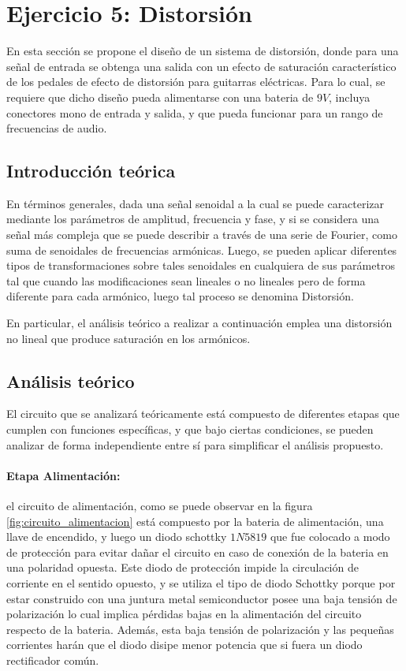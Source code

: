 
\section{Ejercicio 5: Distorsi\'on}
En esta secci\'on se propone el dise\~no de un sistema de distorsi\'on, donde para una se\~nal de entrada se obtenga una salida
con un efecto de saturaci\'on caracter\'istico de los pedales de efecto de distorsi\'on para guitarras el\'ectricas. Para lo cual,
se requiere que dicho dise\~no pueda alimentarse con una bateria de $9V$, incluya conectores mono de entrada y salida, y que pueda funcionar para un rango
de frecuencias de audio.

\subsection{Introducci\'on te\'orica}
En t\'erminos generales, dada una se\~nal senoidal a la cual se puede caracterizar mediante los par\'ametros de amplitud, frecuencia y fase,
y si se considera una se\~nal m\'as compleja que se puede describir a trav\'es de una serie de Fourier, como suma de senoidales de frecuencias arm\'onicas. Luego, 
se pueden aplicar diferentes tipos de transformaciones sobre tales senoidales en cualquiera de sus par\'ametros tal
que cuando las modificaciones sean lineales o no lineales pero de forma diferente para cada arm\'onico, luego tal proceso se denomina Distorsi\'on.

En particular, el an\'alisis te\'orico a realizar a continuaci\'on emplea una distorsi\'on no lineal que produce saturaci\'on en los arm\'onicos.

\subsection{An\'alisis te\'orico}
El circuito que se analizar\'a te\'oricamente est\'a compuesto de diferentes etapas que cumplen con funciones
espec\'ificas, y que bajo ciertas condiciones, se pueden analizar de forma independiente entre s\'i para simplificar el an\'alisis propuesto.

\paragraph*{Etapa Alimentaci\'on:} el circuito de alimentaci\'on, como se puede observar en la figura \ref{fig:circuito_alimentacion}
est\'a compuesto por la bateria de alimentaci\'on, una llave de encendido, y luego un diodo schottky $1N5819$ que fue colocado a modo de protecci\'on
para evitar da\~nar el circuito en caso de conexi\'on de la bateria en una polaridad opuesta. Este diodo de protecci\'on impide la circulaci\'on de corriente
en el sentido opuesto, y se utiliza el tipo de diodo Schottky porque por estar construido con una juntura metal semiconductor posee una baja tensi\'on de polarizaci\'on
lo cual implica p\'erdidas bajas en la alimentaci\'on del circuito respecto de la bateria. Adem\'as, esta baja tensi\'on de polarizaci\'on y las peque\~nas corrientes har\'an que
el diodo disipe menor potencia que si fuera un diodo rectificador com\'un.

